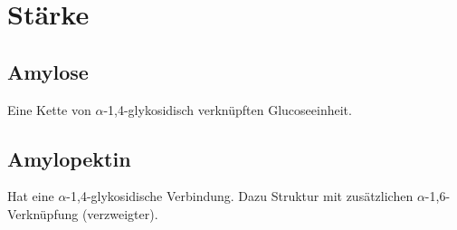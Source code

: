 \section{Stärke}

\subsection{Amylose}
Eine Kette von $\alpha$-1,4-glykosidisch verknüpften Glucoseeinheit. 

\subsection{Amylopektin}
Hat eine $\alpha$-1,4-glykosidische Verbindung. 
Dazu Struktur mit zusätzlichen $\alpha$-1,6-Verknüpfung (verzweigter).

